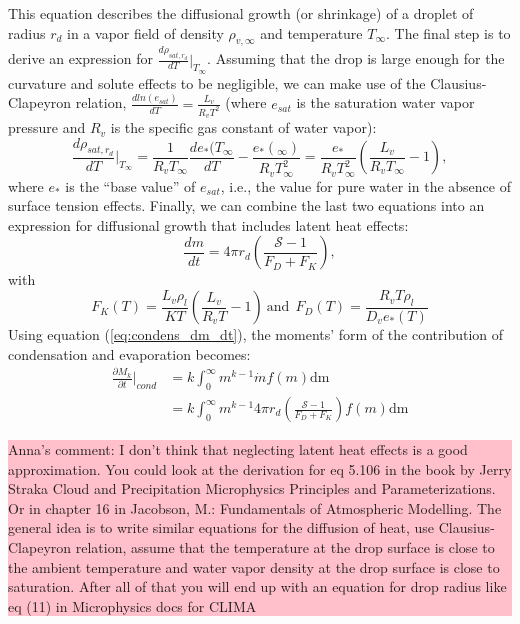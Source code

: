 \documentclass{report}
\begin{document}
This equation describes the diffusional growth (or shrinkage) of a droplet of radius $r_d$ in a vapor field of density $\rho_{v, \infty}$ and temperature $T_\infty$. The final step is to derive an expression for $\frac{d\rho_{sat, r_d}}{dT}\biggr\rvert_{T_{\infty}}$. Assuming that the drop is large enough for the curvature and solute effects to be negligible, we can make use of the Clausius-Clapeyron relation, $\frac{d ln(e_{sat})}{dT} = \frac{L_v}{R_v T^2}$ (where $e_{sat}$ is the saturation water vapor pressure and $R_v$ is the specific gas constant of water vapor):
\begin{equation}
    \frac{d\rho_{sat, r_d}}{dT}\biggr\rvert_{T_{\infty}} = \frac{1}{R_v T_\infty} \frac{d e_*(T_\infty}{dT} - \frac{e_*(_\infty)}{R_v T_\infty^2} = \frac{e_*}{R_v T_\infty^2} \left(\frac{L_v}{R_v T_\infty} - 1 \right),
\label{eq:claus_clap}
\end{equation}
where $e_*$ is the ``base value'' of $e_{sat}$, i.e., the value for pure water in the absence of surface tension effects. Finally, we can combine the last two equations into an expression for diffusional growth that includes latent heat effects:
\begin{equation}
    \frac{dm}{dt} = 4 \pi r_d \left(\frac{\mathcal{S} - 1}{F_D + F_K}\right), 
\end{equation}
with
\begin{equation}
    F_K(T) = \frac{L_v \rho_l}{K T} \left(\frac{L_v}{R_vT} - 1\right) ~\textrm{and} ~~ F_D(T) = \frac{R_v T \rho_l}{D_v e_*(T)}
\end{equation}
Using equation (\ref{eq:condens_dm_dt}), the moments' form of the contribution of condensation and evaporation becomes:
\begin{equation}
\begin{aligned}
    \frac{\partial M_k}{\partial t} \biggr\rvert_{cond} &= k\int_0^\infty m^{k-1}\dot{m}f(m) \text{dm} \\
                                                        &= k\int_0^\infty m^{k-1}4 \pi r_d \left(\frac{\mathcal{S} - 1}{F_D + F_K}\right)f(m) \text{dm}
\label{eq:condensation_moments}
\end{aligned}
\end{equation}
\noindent
\colorbox{pink}{\parbox{12cm}{Anna's comment: I don't think that neglecting latent heat effects is a good approximation. 
You could look at the derivation for eq 5.106 in the book by Jerry Straka Cloud and Precipitation 
Microphysics Principles and Parameterizations. Or in chapter 16 in Jacobson, M.: Fundamentals of Atmospheric Modelling. The general idea is to write similar equations for the diffusion of heat,
use Clausius-Clapeyron relation, assume that the temperature at the drop surface is close to the ambient temperature and water vapor density at the drop surface is close to saturation.
After all of that you will end up with an equation for drop radius like eq (11) in Microphysics
docs for CLIMA}}
\end{document}
